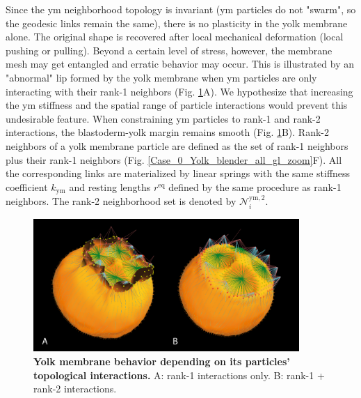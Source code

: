 Since the ym neighborhood topology is invariant (ym particles do not "swarm", so the geodesic links remain the same), there is no plasticity in the yolk membrane alone. The original shape is recovered after local mechanical deformation (local pushing or pulling). Beyond a certain level of stress, however, the membrane mesh may get entangled and erratic behavior may occur. This is illustrated by an "abnormal" lip formed by the yolk membrane when ym particles are only interacting with their rank-1 neighbors (Fig. \ref{Case_0_Yolk_erratic_topology}A). We hypothesize that increasing the ym stiffness and the spatial range of particle interactions would prevent this undesirable feature. When constraining ym particles to rank-1 and rank-2 interactions, the blastoderm-yolk margin remains smooth (Fig. \ref{Case_0_Yolk_erratic_topology}B). Rank-2 neighbors of a yolk membrane particle are defined as the set of rank-1 neighbors plus their rank-1 neighbors (Fig. \ref{Case_0_Yolk_blender_all_gl_zoom}F). All the corresponding links are materialized by linear springs with the same stiffness coefficient $k_{\mathrm{ym}}$ and resting lengths $r^{\mathrm{eq}}$ defined by the same procedure as rank-1 neighbors. The rank-2 neighborhood set is denoted by $\mathcal{N}^{\mathrm{ym},2}_i$.
\begin{figure}
\begin{center}
\includegraphics[width=0.9\textwidth]{../../images/Cases_Studies/Case_0_Yolk/erratic_topology.png}
\end{center}
\caption{\textbf{Yolk membrane behavior depending on its particles' topological interactions.} A: rank-1 interactions only. B: rank-1 + rank-2 interactions. }
\label{Case_0_Yolk_erratic_topology}
\end{figure}
